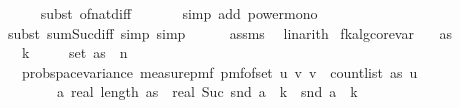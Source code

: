 \begin{isabellebody}
\ \ \ \ \isamarkupfalse%
\ {\isacharparenleft}{\kern0pt}subst\ of{\isacharunderscore}{\kern0pt}nat{\isacharunderscore}{\kern0pt}diff{\isacharparenright}{\kern0pt}\ \isanewline
\ \ \ \ \isamarkupfalse%
\ {\isacharparenleft}{\kern0pt}simp\ add{\isacharcolon}{\kern0pt}\ power{\isacharunderscore}{\kern0pt}mono{\isacharparenright}{\kern0pt}\isanewline
\ \ \ \ \isamarkupfalse%
\ {\isacharparenleft}{\kern0pt}subst\ sum{\isacharunderscore}{\kern0pt}Suc{\isacharunderscore}{\kern0pt}diff{\isacharprime}{\kern0pt}{\isacharcomma}{\kern0pt}\ simp{\isacharcomma}{\kern0pt}\ simp{\isacharparenright}{\kern0pt}\isanewline
\ \ \ \ \isamarkupfalse%
\ assms\ \isamarkupfalse%
\ linarith\isanewline
{}\isamarkupfalse%
%
\endisatagproof
{\isafoldproof}%
%
\isadelimproof
\isanewline
%
\endisadelimproof
\isanewline
{}\isamarkupfalse%
\ fk{\isacharunderscore}{\kern0pt}alg{\isacharunderscore}{\kern0pt}core{\isacharunderscore}{\kern0pt}var{\isacharcolon}{\kern0pt}\isanewline
\ \ \ {\isachardoublequoteopen}as\ {\isasymnoteq}\ {\isacharbrackleft}{\kern0pt}{\isacharbrackright}{\kern0pt}{\isachardoublequoteclose}\isanewline
\ \ \ {\isachardoublequoteopen}k\ {\isasymge}\ {}{\isachardoublequoteclose}\isanewline
\ \ \ {\isachardoublequoteopen}set\ as\ {\isasymsubseteq}\ {\isacharbraceleft}{\kern0pt}{}{\isachardot}{\kern0pt}{\isachardot}{\kern0pt}{\isacharless}{\kern0pt}n{\isacharbraceright}{\kern0pt}{\isachardoublequoteclose}\isanewline
\ \ \ {\isachardoublequoteopen}prob{\isacharunderscore}{\kern0pt}space{\isachardot}{\kern0pt}variance\ {\isacharparenleft}{\kern0pt}measure{\isacharunderscore}{\kern0pt}pmf\ {\isacharparenleft}{\kern0pt}pmf{\isacharunderscore}{\kern0pt}of{\isacharunderscore}{\kern0pt}set\ {\isacharbraceleft}{\kern0pt}{\isacharparenleft}{\kern0pt}u{\isacharcomma}{\kern0pt}\ v{\isacharparenright}{\kern0pt}{\isachardot}{\kern0pt}\ v\ {\isacharless}{\kern0pt}\ count{\isacharunderscore}{\kern0pt}list\ as\ u{\isacharbraceright}{\kern0pt}{\isacharparenright}{\kern0pt}{\isacharparenright}{\kern0pt}\isanewline
\ \ \ \ \ \ \ \ {\isacharparenleft}{\kern0pt}{\isasymlambda}a{\isachardot}{\kern0pt}\ real\ {\isacharparenleft}{\kern0pt}length\ as{\isacharparenright}{\kern0pt}\ {\isacharasterisk}{\kern0pt}\ real\ {\isacharparenleft}{\kern0pt}Suc\ {\isacharparenleft}{\kern0pt}snd\ a{\isacharparenright}{\kern0pt}\ {\isacharcircum}{\kern0pt}\ k\ {\isacharminus}{\kern0pt}\ snd\ a\ {\isacharcircum}{\kern0pt}\ k{\isacharparenright}{\kern0pt}{\isacharparenright}{\kern0pt}\isanewline

\end{isabellebody}
